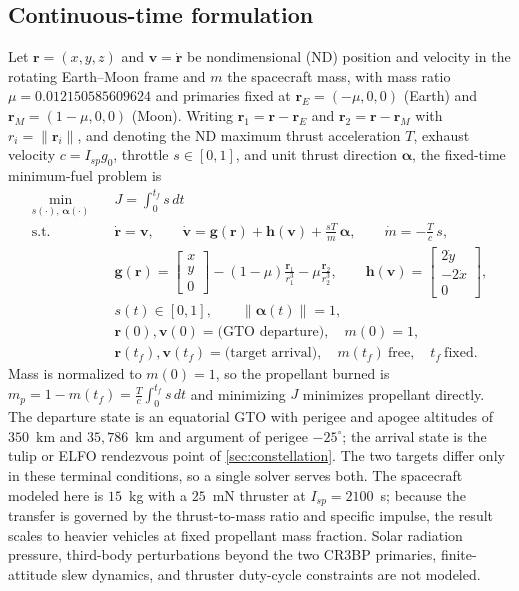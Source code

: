 \documentclass[11pt]{article}
\begin{document}
\subsection{Continuous-time formulation}
Let $\boldsymbol r=(x,y,z)$ and $\boldsymbol v=\dot{\boldsymbol r}$ be
nondimensional (ND) position and velocity in the rotating Earth--Moon frame and
$m$ the spacecraft mass, with mass ratio $\mu=0.012150585609624$ and primaries
fixed at $\boldsymbol r_E=(-\mu,0,0)$ (Earth) and $\boldsymbol r_M=(1-\mu,0,0)$
(Moon). Writing $\boldsymbol r_1=\boldsymbol r-\boldsymbol r_E$ and
$\boldsymbol r_2=\boldsymbol r-\boldsymbol r_M$ with $r_i=\lVert\boldsymbol
r_i\rVert$, and denoting the ND maximum thrust acceleration $T$, exhaust velocity
$c=I_{sp}g_0$, throttle $s\in[0,1]$, and unit thrust direction $\boldsymbol
\alpha$, the fixed-time minimum-fuel problem is
\begin{equation}
\begin{aligned}
\min_{s(\cdot),\,\boldsymbol\alpha(\cdot)}\quad
  & J=\int_0^{t_f} s\,dt \\[2pt]
\text{s.t.}\quad
  & \dot{\boldsymbol r}=\boldsymbol v,\qquad
    \dot{\boldsymbol v}=\boldsymbol g(\boldsymbol r)+\boldsymbol h(\boldsymbol v)
      +\frac{sT}{m}\,\boldsymbol\alpha,\qquad
    \dot m=-\frac{T}{c}\,s,\\[2pt]
  & \boldsymbol g(\boldsymbol r)=\begin{bmatrix}x\\y\\0\end{bmatrix}
      -(1-\mu)\frac{\boldsymbol r_1}{r_1^{3}}
      -\mu\frac{\boldsymbol r_2}{r_2^{3}},\qquad
    \boldsymbol h(\boldsymbol v)=\begin{bmatrix}2\dot y\\-2\dot x\\0\end{bmatrix},\\[2pt]
  & s(t)\in[0,1],\qquad \lVert\boldsymbol\alpha(t)\rVert=1,\\[2pt]
  & \boldsymbol r(0),\boldsymbol v(0)=\text{(GTO departure)},\quad m(0)=1,\\[2pt]
  & \boldsymbol r(t_f),\boldsymbol v(t_f)=\text{(target arrival)},\quad
    m(t_f)\ \text{free},\quad t_f\ \text{fixed}.
\end{aligned}
\label{eq:ocp}
\end{equation}
Mass is normalized to $m(0)=1$, so the propellant burned is $m_p=1-m(t_f)=
\tfrac{T}{c}\int_0^{t_f}s\,dt$ and minimizing $J$ minimizes propellant directly.
The departure state is an equatorial GTO with perigee and apogee altitudes of
$350$~km and $35{,}786$~km and argument of perigee $-25^\circ$; the arrival state
is the tulip or ELFO rendezvous point of \cref{sec:constellation}. The two
targets differ only in these terminal conditions, so a single solver serves both.
The spacecraft modeled here is $15$~kg with a $25$~mN thruster at
$I_{sp}=2100$~s; because the transfer is governed by the thrust-to-mass ratio and
specific impulse, the result scales to heavier vehicles at fixed propellant mass
fraction. Solar radiation pressure, third-body perturbations beyond the two CR3BP
primaries, finite-attitude slew dynamics, and thruster duty-cycle constraints are
not modeled.
\end{document}
